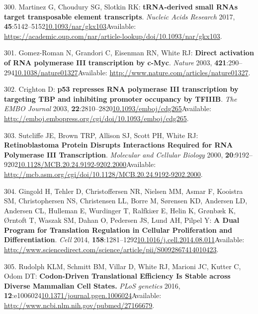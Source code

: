 \documentclass[
]{book}
\begin{document}
\leavevmode\hypertarget{ref-Martinez2017}{}%
300. Martinez G, Choudury SG, Slotkin RK: \textbf{tRNA-derived small RNAs target transposable element transcripts}. \emph{Nucleic Acids Research} 2017, \textbf{45}:5142--5152\href{https://doi.org/10.1093/nar/gkx103}{10.1093/nar/gkx103}Available: \url{https://academic.oup.com/nar/article-lookup/doi/10.1093/nar/gkx103}.

\leavevmode\hypertarget{ref-Gomez-Roman2003}{}%
301. Gomez-Roman N, Grandori C, Eisenman RN, White RJ: \textbf{Direct activation of RNA polymerase III transcription by c-Myc}. \emph{Nature} 2003, \textbf{421}:290--294\href{https://doi.org/10.1038/nature01327}{10.1038/nature01327}Available: \url{http://www.nature.com/articles/nature01327}.

\leavevmode\hypertarget{ref-Crighton2003}{}%
302. Crighton D: \textbf{p53 represses RNA polymerase III transcription by targeting TBP and inhibiting promoter occupancy by TFIIIB}. \emph{The EMBO Journal} 2003, \textbf{22}:2810--2820\href{https://doi.org/10.1093/emboj/cdg265}{10.1093/emboj/cdg265}Available: \url{http://emboj.embopress.org/cgi/doi/10.1093/emboj/cdg265}.

\leavevmode\hypertarget{ref-Sutcliffe2000}{}%
303. Sutcliffe JE, Brown TRP, Allison SJ, Scott PH, White RJ: \textbf{Retinoblastoma Protein Disrupts Interactions Required for RNA Polymerase III Transcription}. \emph{Molecular and Cellular Biology} 2000, \textbf{20}:9192--9202\href{https://doi.org/10.1128/MCB.20.24.9192-9202.2000}{10.1128/MCB.20.24.9192-9202.2000}Available: \url{http://mcb.asm.org/cgi/doi/10.1128/MCB.20.24.9192-9202.2000}.

\leavevmode\hypertarget{ref-Gingold2014}{}%
304. Gingold H, Tehler D, Christoffersen NR, Nielsen MM, Asmar F, Kooistra SM, Christophersen NS, Christensen LL, Borre M, Sørensen KD, Andersen LD, Andersen CL, Hulleman E, Wurdinger T, Ralfkiær E, Helin K, Grønbæk K, Ørntoft T, Waszak SM, Dahan O, Pedersen JS, Lund AH, Pilpel Y: \textbf{A Dual Program for Translation Regulation in Cellular Proliferation and Differentiation}. \emph{Cell} 2014, \textbf{158}:1281--1292\href{https://doi.org/10.1016/j.cell.2014.08.011}{10.1016/j.cell.2014.08.011}Available: \url{http://www.sciencedirect.com/science/article/pii/S0092867414010423}.

\leavevmode\hypertarget{ref-Rudolph2016}{}%
305. Rudolph KLM, Schmitt BM, Villar D, White RJ, Marioni JC, Kutter C, Odom DT: \textbf{Codon-Driven Translational Efficiency Is Stable across Diverse Mammalian Cell States.} \emph{PLoS genetics} 2016, \textbf{12}:e1006024\href{https://doi.org/10.1371/journal.pgen.1006024}{10.1371/journal.pgen.1006024}Available: \url{http://www.ncbi.nlm.nih.gov/pubmed/27166679}.
\end{document}
